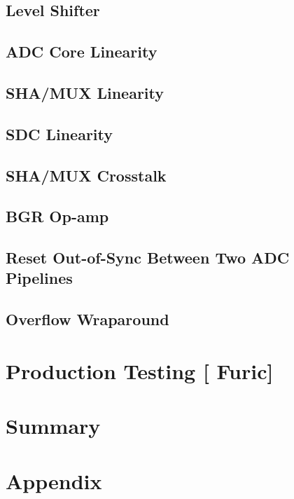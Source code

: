 \documentclass[12pt]{article}
\begin{document}
\subsection{Level Shifter}
\subsection{ADC Core Linearity}
\subsection{SHA/MUX Linearity}
\subsection{SDC Linearity}
\subsection{SHA/MUX Crosstalk}
\subsection{BGR Op-amp}	
\subsection{Reset Out-of-Sync Between Two ADC Pipelines}
\subsection{Overflow Wraparound}


\section{Production Testing   [{\color{red} Furic}] }


\newpage
\section{Summary}  
%	

\newpage
%


\newpage
\section*{Appendix}

\end{document}
